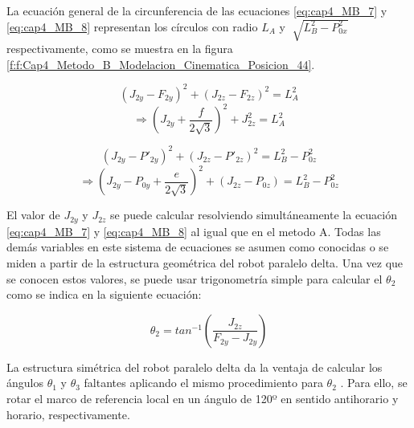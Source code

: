       La ecuación general de la circunferencia de las ecuaciones \ref{eq:cap4_MB_7} y \ref{eq:cap4_MB_8} representan los círculos con radio  \( L_{A} \)  y  \( \sqrt[]{L_{B}^{2}-P_{0x}^{2}} \)  respectivamente, como se muestra en la figura \ref{f:f:Cap4_Metodo_B_Modelacion_Cinematica_Posicion_44}.
  
  
        \begin{equation*}
              (J_{2y}-F_{2y})^2 + (J_{2z}-F_{2z})^2=  L_{A}^{2}
        \end{equation*}
        \begin{equation}
              \Rightarrow  \left (J_{2y} + \frac{f}{2\sqrt{3}}\right)^2 + J_{2z}^{2}= L_{A}^{2}
        \label{eq:cap4_MB_7}
        \end{equation}     

        \begin{equation*}
              (J_{2y}-{P'}_{2y})^2 + (J_{2z}-{P'}_{2z})^2= L_{B}^{2} -P_{0z}^2 
        \end{equation*}          
        \begin{equation}
             \Rightarrow   \left (J_{2y} - P_{0y}+ \frac{e}{2\sqrt{3}}\right)^2 + ({J}_{2z}-{P}_{0z}) = L_{B}^{2} -P_{0z}^2
        \label{eq:cap4_MB_8}
        \end{equation}  
    
    
        El valor de  \( J_{2y} \)  y  \( J_{2z} \)  se puede calcular resolviendo simultáneamente la ecuación \ref{eq:cap4_MB_7} y \ref{eq:cap4_MB_8} al igual que en el metodo A. Todas las demás variables en este sistema de ecuaciones se asumen como conocidas o se miden a partir de la estructura geométrica del robot paralelo delta. Una vez que se conocen estos valores, se puede usar trigonometría simple para calcular el  \(  \theta _{2} \)  como se indica en la siguiente ecuación:
        
        \begin{equation} 
            \theta_2=tan^{-1} \left(\frac{J_{2z}}{{F}_{2y}-{J}_{2y}}\right)
        \label{eq:cap4_MB_9}
        \end{equation}  
        \newpage

        La estructura simétrica del robot paralelo delta da la ventaja de calcular los ángulos  \(  \theta _{1} \)  y  \(  \theta _{3} \)  faltantes aplicando el mismo procedimiento para  \(  \theta _{2} \) . Para ello, se rotar el marco de referencia local en un ángulo de 120º en sentido antihorario y horario, respectivamente.   
           
